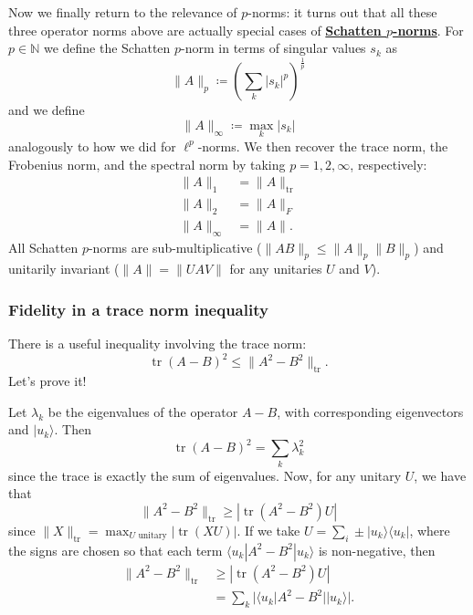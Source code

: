 \documentclass[fleqn]{article}
\begin{document}
Now we finally return to the relevance of \(p\)-norms: it turns out that all these three operator norms above are actually special cases of \href{https://en.wikipedia.org/wiki/Schatten_norm}{\textbf{Schatten \(p\)-norms}}.
For \(p\in\mathbb{N}\) we define the Schatten \(p\)-norm in terms of singular values \(s_k\) as
\[
  \|A\|_p \coloneqq \left( \sum_k |s_k|^p \right)^\frac{1}{p}
\]
and we define
\[
  \|A\|_\infty \coloneqq \max_k |s_k|
\]
analogously to how we did for \(\ell^p\)-norms.
We then recover the trace norm, the Frobenius norm, and the spectral norm by taking \(p=1,2,\infty\), respectively:
\[
  \begin{aligned}
    \|A\|_1
    &= \|A\|_{\operatorname{tr}}
  \\\|A\|_2
    &= \|A\|_F
  \\\|A\|_\infty
    &= \|A\|.
  \end{aligned}
\]
All Schatten \(p\)-norms are sub-multiplicative (\(\|AB\|_p\leqslant\|A\|_p\|B\|_p\)) and unitarily invariant (\(\|A\|=\|UAV\|\) for any unitaries \(U\) and \(V\)).

\hypertarget{fidelity-in-a-trace-norm-inequality}{%
\subsubsection{Fidelity in a trace norm inequality}\label{fidelity-in-a-trace-norm-inequality}}

There is a useful inequality involving the trace norm:
\[
  \operatorname{tr}(A-B)^2 \leqslant\|A^2-B^2\|_{\operatorname{tr}}.
\]
Let's prove it!

Let \(\lambda_k\) be the eigenvalues of the operator \(A-B\), with corresponding eigenvectors and \(|u_k\rangle\).
Then
\[
  \operatorname{tr}(A-B)^2 = \sum_k \lambda_k^2
\]
since the trace is exactly the sum of eigenvalues.
Now, for any unitary \(U\), we have that
\[
  \|A^2-B^2\|_{\operatorname{tr}} \geqslant|\operatorname{tr}(A^2-B^2)U|
\]
since \(\|X\|_{\operatorname{tr}}=\max_{U\text{ unitary}} |\operatorname{tr}(XU)|\).
If we take \(U=\sum_i\pm|u_k\rangle\langle u_k|\), where the signs are chosen so that each term \(\langle u_k|A^2-B^2|u_k\rangle\) is non-negative, then
\[
  \begin{aligned}
    \|A^2-B^2\|_{\operatorname{tr}}
    &\geqslant|\operatorname{tr}(A^2-B^2)U|
  \\&= \sum_k |\langle u_k|A^2-B^2||u_k\rangle|.
  \end{aligned}
\]
\end{document}
